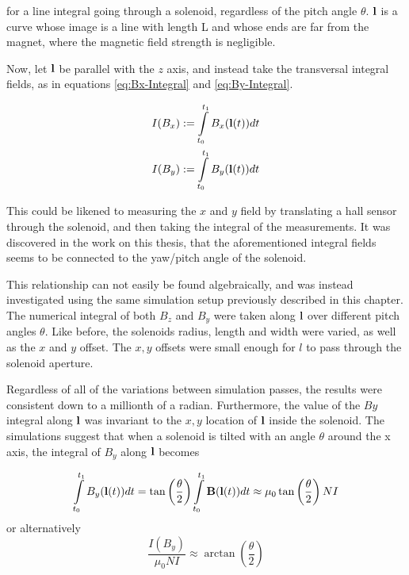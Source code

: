 for a line integral going through a solenoid, regardless of the pitch
angle $\theta$. $\vb{l}$ is a curve whose image
is a line with length L and whose ends are far from the magnet, where
the magnetic field strength is negligible.

Now, let $\vb{l}$ be parallel with the $z$ axis, and instead take the
transversal integral fields, as in equations \ref{eq:Bx-Integral} and
\ref{eq:By-Integral}.

\begin{align}
    I(B_x) & := \int \limits_{t_0}^{t_1} B_x(\vb{l}(t))dt
    \label{eq:Bx-Integral}                                 \\
    I(B_y) & := \int \limits_{t_0}^{t_1} B_y(\vb{l}(t))dt
    \label{eq:By-Integral}
\end{align}

This could be
likened to measuring the $x$ and $y$ field by translating a hall sensor
through the solenoid, and then taking the integral of the measurements.
It was discovered in the work on this thesis, that the aforementioned
integral fields seems to be connected to the yaw/pitch angle of the
solenoid.

This relationship can not easily
be found algebraically, and was instead investigated using the same
simulation setup previously described in this chapter. The numerical integral of
both $B_z$ and $B_y$ were taken along $\vb{l}$ over different pitch angles $\theta$.
Like before, the solenoids
radius, length and width were varied, as well as the $x$ and $y$ offset.
The $x, y$ offsets were small enough
for $l$ to pass through the solenoid aperture.

Regardless of all of the variations between simulation passes, the results were
consistent down to a millionth of a radian.
Furthermore, the value of the $By$ integral along $\vb{l}$
was invariant to the $x,y$ location of $\vb{l}$ inside the solenoid.
The simulations suggest that when a solenoid is tilted with an angle $\theta$
around the x axis, the integral of $B_y$ along $\vb{l}$ becomes

\begin{equation}
    \int \limits_{t_0}^{t_1} B_y(\vb{l}(t))dt =
    \tan\left( \frac{\theta}{2} \right) 
    \int\limits_{t_0}^{t_1} \vb{B}(\vb{l}(t)) dt
    \approx \mu_0\tan\left( \frac{\theta}{2} \right) NI
    \label{eq:tanhalf}
\end{equation}
or alternatively
\begin{equation}
    \frac{I(B_y)}{\mu_0NI} \approx \arctan(\frac{\theta}{2})
    \label{eq:Byint-Error}
\end{equation}

